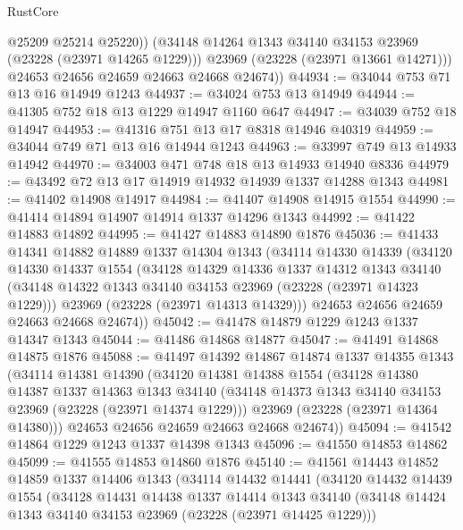 \begin{lexlean}{RustCore}
\begin{coremodule}
              @25209
              @25214
              @25220))
          (@34148 @14264 @1343 @34140 @34153 @23969 (@23228 (@23971 @14265 @1229)))
          @23969
          (@23228 (@23971 @13661 @14271)))
        @24653
        @24656
        @24659
        @24663
        @24668
        @24674))
@44934 := @34044 @753 @71 @13 @16 @14949 @1243
@44937 := @34024 @753 @13 @14949
@44944 := @41305 @752 @18 @13 @1229 @14947 @1160 @647
@44947 := @34039 @752 @18 @14947
@44953 := @41316 @751 @13 @17 @8318 @14946 @40319
@44959 := @34044 @749 @71 @13 @16 @14944 @1243
@44963 := @33997 @749 @13 @14933 @14942
@44970 := @34003 @471 @748 @18 @13 @14933 @14940 @8336
@44979 := @43492 @72 @13 @17 @14919 @14932 @14939 @1337 @14288 @1343
@44981 := @41402 @14908 @14917
@44984 := @41407 @14908 @14915 @1554
@44990 := @41414 @14894 @14907 @14914 @1337 @14296 @1343
@44992 := @41422 @14883 @14892
@44995 := @41427 @14883 @14890 @1876
@45036 := @41433
    @14341
    @14882
    @14889
    @1337
    @14304
    @1343
    (@34114
      @14330
      @14339
      (@34120
        @14330
        @14337
        @1554
        (@34128
          @14329
          @14336
          @1337
          @14312
          @1343
          @34140
          (@34148 @14322 @1343 @34140 @34153 @23969 (@23228 (@23971 @14323 @1229)))
          @23969
          (@23228 (@23971 @14313 @14329)))
        @24653
        @24656
        @24659
        @24663
        @24668
        @24674))
@45042 := @41478 @14879 @1229 @1243 @1337 @14347 @1343
@45044 := @41486 @14868 @14877
@45047 := @41491 @14868 @14875 @1876
@45088 := @41497
    @14392
    @14867
    @14874
    @1337
    @14355
    @1343
    (@34114
      @14381
      @14390
      (@34120
        @14381
        @14388
        @1554
        (@34128
          @14380
          @14387
          @1337
          @14363
          @1343
          @34140
          (@34148 @14373 @1343 @34140 @34153 @23969 (@23228 (@23971 @14374 @1229)))
          @23969
          (@23228 (@23971 @14364 @14380)))
        @24653
        @24656
        @24659
        @24663
        @24668
        @24674))
@45094 := @41542 @14864 @1229 @1243 @1337 @14398 @1343
@45096 := @41550 @14853 @14862
@45099 := @41555 @14853 @14860 @1876
@45140 := @41561
    @14443
    @14852
    @14859
    @1337
    @14406
    @1343
    (@34114
      @14432
      @14441
      (@34120
        @14432
        @14439
        @1554
        (@34128
          @14431
          @14438
          @1337
          @14414
          @1343
          @34140
          (@34148 @14424 @1343 @34140 @34153 @23969 (@23228 (@23971 @14425 @1229)))

\end{coremodule}
\end{lexlean}
